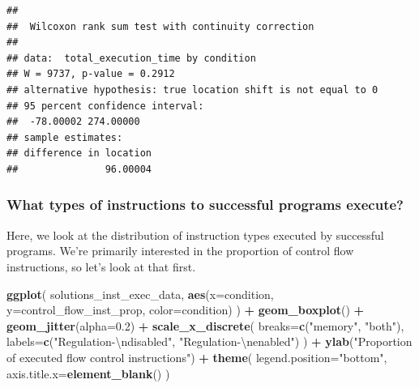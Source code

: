 \documentclass[
]{book}
\newenvironment{Shaded}{\begin{snugshade}}{\end{snugshade}}
\newcommand{\CharTok}[1]{\textcolor[rgb]{0.31,0.60,0.02}{#1}}
\newcommand{\DataTypeTok}[1]{\textcolor[rgb]{0.13,0.29,0.53}{#1}}
\newcommand{\FloatTok}[1]{\textcolor[rgb]{0.00,0.00,0.81}{#1}}
\newcommand{\KeywordTok}[1]{\textcolor[rgb]{0.13,0.29,0.53}{\textbf{#1}}}
\newcommand{\NormalTok}[1]{#1}
\newcommand{\OperatorTok}[1]{\textcolor[rgb]{0.81,0.36,0.00}{\textbf{#1}}}
\newcommand{\StringTok}[1]{\textcolor[rgb]{0.31,0.60,0.02}{#1}}
\begin{document}
\begin{verbatim}
## 
##  Wilcoxon rank sum test with continuity correction
## 
## data:  total_execution_time by condition
## W = 9737, p-value = 0.2912
## alternative hypothesis: true location shift is not equal to 0
## 95 percent confidence interval:
##  -78.00002 274.00000
## sample estimates:
## difference in location 
##               96.00004
\end{verbatim}

\hypertarget{what-types-of-instructions-to-successful-programs-execute-2}{%
\subsubsection{What types of instructions to successful programs execute?}\label{what-types-of-instructions-to-successful-programs-execute-2}}

Here, we look at the distribution of instruction types executed by successful programs.
We're primarily interested in the proportion of control flow instructions, so let's look at that first.

\begin{Shaded}
\begin{Highlighting}[]
\KeywordTok{ggplot}\NormalTok{( solutions\_inst\_exec\_data, }\KeywordTok{aes}\NormalTok{(}\DataTypeTok{x=}\NormalTok{condition, }\DataTypeTok{y=}\NormalTok{control\_flow\_inst\_prop, }\DataTypeTok{color=}\NormalTok{condition) ) }\OperatorTok{+}
\StringTok{  }\KeywordTok{geom\_boxplot}\NormalTok{() }\OperatorTok{+}
\StringTok{  }\KeywordTok{geom\_jitter}\NormalTok{(}\DataTypeTok{alpha=}\FloatTok{0.2}\NormalTok{) }\OperatorTok{+}
\StringTok{  }\KeywordTok{scale\_x\_discrete}\NormalTok{(}
    \DataTypeTok{breaks=}\KeywordTok{c}\NormalTok{(}\StringTok{"memory"}\NormalTok{, }\StringTok{"both"}\NormalTok{),}
    \DataTypeTok{labels=}\KeywordTok{c}\NormalTok{(}\StringTok{"Regulation{-}}\CharTok{\textbackslash{}n}\StringTok{disabled"}\NormalTok{, }\StringTok{"Regulation{-}}\CharTok{\textbackslash{}n}\StringTok{enabled"}\NormalTok{)}
\NormalTok{  ) }\OperatorTok{+}
\StringTok{  }\KeywordTok{ylab}\NormalTok{(}\StringTok{"Proportion of executed flow control instructions"}\NormalTok{) }\OperatorTok{+}
\StringTok{  }\KeywordTok{theme}\NormalTok{(}
    \DataTypeTok{legend.position=}\StringTok{"bottom"}\NormalTok{,}
    \DataTypeTok{axis.title.x=}\KeywordTok{element\_blank}\NormalTok{()}
\NormalTok{  )}
\end{Highlighting}
\end{Shaded}
\end{document}
